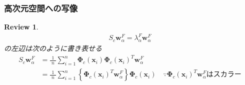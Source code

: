 \documentclass[dvipdfmx,cjk]{beamer}
\theoremstyle{example}
\newtheorem{rev}[thm]{Review}
\begin{document}
\begin{frame}
    \frametitle{高次元空間への写像}
    \begin{rev}
        \begin{align*}
            S_c\boldsymbol{w}_\alpha^F=\lambda_\alpha^F\boldsymbol{w}_\alpha^F
        \end{align*}
        の左辺は次のように書き表せる
        \begin{align*}
            S_c\boldsymbol{w}_\alpha^F & =\frac{1}{\;n\;}\sum_{i=1}^{n}\boldsymbol{\Phi}_c(\boldsymbol{x}_i)\boldsymbol{\Phi}_c(\boldsymbol{x}_i)^T\boldsymbol{w}_\alpha^F                                                                                                         \\
                                       & =\frac{1}{\;n\;}\sum_{i=1}^{n}\left\{\boldsymbol{\Phi}_c(\boldsymbol{x}_i)^T\boldsymbol{w}_\alpha^F\right\}\boldsymbol{\Phi}_c(\boldsymbol{x}_i)\quad\because\text{$\boldsymbol{\Phi}_c(\boldsymbol{x}_i)^T\boldsymbol{w}_\alpha^F$はスカラー}
        \end{align*}
    \end{rev}
\end{frame}
\end{document}

